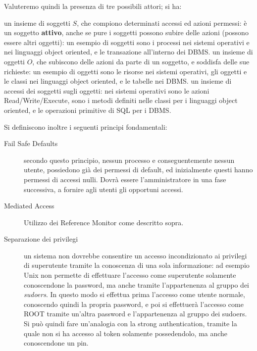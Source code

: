 Valuteremo quindi la presenza di tre possibili attori; si ha:
\begin{itemize}
\diam un insieme di soggetti $S$, che compiono determinati accessi ed azioni
	permessi: è un soggetto \textbf{attivo}, anche se pure i soggetti possono
	subire delle azioni (possono essere altri oggetti): un esempio di soggetti
	sono i processi nei sistemi operativi e nei linguaggi object oriented, e le
	transazione all'interno dei DBMS.
\diam un insieme di oggetti $O$, che subiscono delle azioni da parte di un 
	soggetto, e soddisfa delle sue richieste: un esempio di oggetti sono
	le risorse nei sistemi operativi, gli oggetti e le classi nei linguaggi
	object oriented, e le tabelle nei DBMS.
\diam un insieme di accessi dei soggetti sugli oggetti: nei sistemi operativi
	sono le azioni Read/Write/Execute, sono i metodi definiti nelle classi
	per i linguaggi object oriented, e le operazioni primitive di SQL per 
	i DBMS.
\end{itemize}
Si definiscono inoltre i seguenti principi fondamentali:
\begin{description}
\item[Fail Safe Defaults] secondo questo principio, nessun processo e conseguentemente
	nessun utente, possiedono già dei permessi di default, ed inizialmente
	questi hanno permessi di accessi nulli. Dovrà essere l'amministratore
	in una fase successiva, a fornire agli utenti gli opportuni accessi.
\item[Mediated Access] Utilizzo dei Reference Monitor come descritto sopra.
\item[Separazione dei privilegi] un sistema non dovrebbe consentire
	un accesso incondizionato ai privilegi di superutente tramite la 
	conoscenza di una sola informazione: ad esempio Unix non permette di
	effettuare l'accesso come superutente solamente conoscendone la password,
	ma anche tramite l'appartenenza al gruppo dei \textit{sudoers}. In questo
	modo si effettua prima l'accesso come utente normale, conoscendo quindi
	la propria password, e poi si effettuerà l'accesso come ROOT tramite 
	un'altra password e l'appartenenza al gruppo dei sudoers. Si può quindi
	fare un'analogia con la strong authentication, tramite la quale non si ha
	accesso al token solamente possedendolo, ma anche conoscendone un pin.
\end{description}

